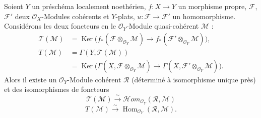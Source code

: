 \begin{corollary}[7.7.7]
Soient $Y$ un préschéma localement noethérien, $f:X\to Y$ un morphisme propre,
$\mathscr F$, $\mathscr F'$ deux $\mathscr O_X$-Modules cohérents et $Y$-plats,
$u:\mathscr F\to\mathscr F'$ un homomorphisme. Considérons les deux foncteurs en
le $\mathscr O_Y$-Module quasi-cohérent $\mathscr M$ :
\begin{align*}
  \mathscr T(\mathscr M)
  &=
  \operatorname{Ker}
  \bigl(
    f_*(\mathscr F\otimes_{\mathscr O_Y}\mathscr M)
    \longrightarrow
    f_*(\mathscr F'\otimes_{\mathscr O_Y}\mathscr M)
  \bigr),\\
  T(\mathscr M)
  &=
  \Gamma(Y,\mathscr T(\mathscr M))\\
  &=
  \operatorname{Ker}
  \bigl(
    \Gamma(X,\mathscr F\otimes_{\mathscr O_Y}\mathscr M)
    \longrightarrow
    \Gamma(X,\mathscr F'\otimes_{\mathscr O_Y}\mathscr M)
  \bigr).
\end{align*}
Alors il existe un $\mathscr O_Y$-Module cohérent $\mathscr R$ (déterminé à
isomorphisme unique près) et des isomorphismes de foncteurs
\[
  \mathscr T(\mathscr M)
  \xrightarrow{\sim}
  \mathscr{H}\!om_{\mathscr O_Y}(\mathscr R,\mathscr M)
  \tag{7.7.7.1}\label{III.7.7.7.1.fr}
\]
\[
  T(\mathscr M)
  \xrightarrow{\sim}
  \operatorname{Hom}_{\mathscr O_Y}(\mathscr R,\mathscr M).
  \tag{7.7.7.2}\label{III.7.7.7.2.fr}
\]
\end{corollary}

